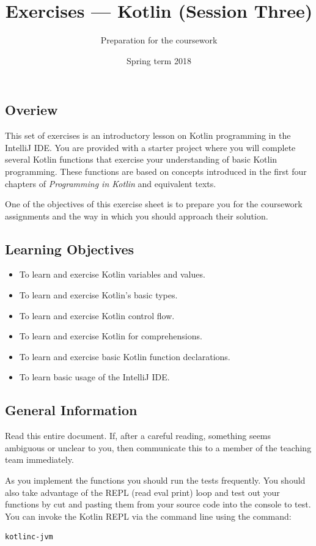 \documentclass[12pt,a4paper]{exam}
\title{Exercises --- Kotlin (Session Three)}
\author{Preparation for the coursework}
\date{Spring term 2018}
\begin{document}
\maketitle

\subsection*{Overiew}

\noindent This set of exercises is an introductory lesson on Kotlin programming in the IntelliJ IDE. 
You are provided with a starter project where you will complete several Kotlin functions that exercise 
your understanding of basic Kotlin programming. These functions are based on concepts introduced in the 
first four chapters of \emph{Programming in Kotlin} and equivalent texts. 

One of the objectives of this exercise sheet is to prepare you for the coursework assignments and the way
in which you should approach their solution.

\subsection*{Learning Objectives}

\begin{itemize}
	\item To learn and exercise Kotlin variables and values.
	\item To learn and exercise Kotlin’s basic types.
	\item To learn and exercise Kotlin control flow.
	\item To learn and exercise Kotlin for comprehensions.
	\item To learn and exercise basic Kotlin function declarations.
	\item To learn basic usage of the IntelliJ IDE.
\end{itemize}

\subsection*{General Information}

Read this entire document. If, after a careful reading, something seems ambiguous or unclear to you, 
then communicate this to a member of the teaching team immediately.

As you implement the functions you should run the tests frequently. 
You should also take advantage of the REPL (read eval print) loop and test out your functions by cut and 
pasting them from your source code into the console to test. You can invoke the Kotlin REPL via the command line
using the command:
\begin{Verbatim}
kotlinc-jvm	
\end{Verbatim}
\end{document}
